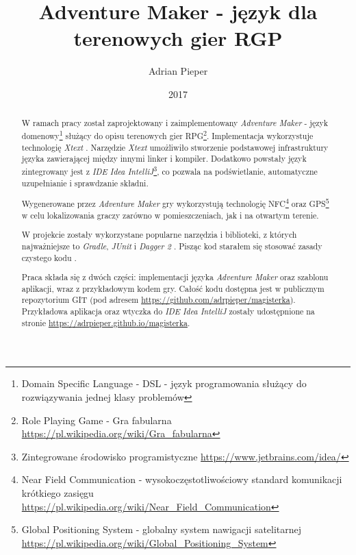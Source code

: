 \documentclass[openright]{xmgr}
\author   {Adrian Pieper}
\title    {Adventure Maker - język dla terenowych gier RGP}
\date     {2017}
\begin{document}
\begin{abstract}
  W ramach pracy został zaprojektowany i zaimplementowany \textit{Adventure Maker} - język domenowy\footnote{Domain Specific Language - DSL - język programowania służący do rozwiązywania jednej klasy problemów} służący do opisu terenowych gier RPG\footnote{Role Playing Game - Gra fabularna \url{https://pl.wikipedia.org/wiki/Gra_fabularna}}. Implementacja wykorzystuje technologię \textit{Xtext} \cite{Xtext:2017:Doc}. Narzędzie \textit{Xtext} umożliwiło stworzenie podstawowej infrastruktury języka zawierającej między innymi linker i kompiler. Dodatkowo powstały język zintegrowany jest z \textit{IDE Idea IntelliJ}\footnote{Zintegrowane środowisko programistyczne \url{https://www.jetbrains.com/idea/}}, co pozwala na podświetlanie, automatyczne uzupełnianie i sprawdzanie składni.
  
  Wygenerowane przez \textit{Adventure Maker} gry wykorzystują technologię NFC\footnote{Near Field Communication - wysokoczęstotliwościowy standard komunikacji krótkiego zasięgu \url{https://pl.wikipedia.org/wiki/Near_Field_Communication}} oraz GPS\footnote{Global Positioning System - globalny system nawigacji satelitarnej \url{https://pl.wikipedia.org/wiki/Global_Positioning_System}} w celu lokalizowania graczy zarówno w pomieszczeniach, jak i na otwartym terenie. 
  
  W projekcie zostały wykorzystane popularne narzędzia i biblioteki, z których najważniejsze to \textit{Gradle}\cite{Gradle:2017:Doc}, \textit{JUnit}\cite{JUnit:2017:Doc} i \textit{Dagger 2} \cite{Dagger2:2017:Doc}. Pisząc kod starałem się stosować zasady czystego kodu \cite{CleanCode:2005}.
  
  Praca składa się z dwóch części: implementacji języka \textit{Adventure Maker} oraz szablonu aplikacji, wraz z przykładowym kodem gry. Całość kodu dostępna jest w publicznym repozytorium GIT (pod adresem \url{https://github.com/adrpieper/magisterka}). Przykładowa aplikacja oraz wtyczka do \textit{IDE Idea IntelliJ} zostały udostępnione na stronie \url{https://adrpieper.github.io/magisterka}.
\end{abstract}


\maketitle

\introduction
\end{document}
